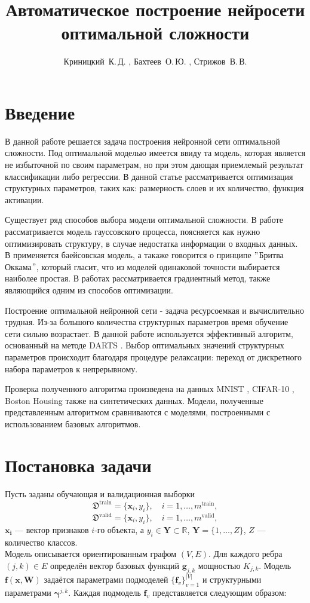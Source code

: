 \documentclass[12pt, twoside]{article}
\title
    {Автоматическое построение нейросети оптимальной сложности }
\author
    {Криницкий~К.\,Д. , Бахтеев~О.\,Ю. , Стрижов~В.\,В.}
\begin{document}
\maketitle

\section{Введение}
  В данной работе решается задача построения нейронной сети оптимальной сложности. Под оптимальной моделью имеется ввиду та модель, которая является не избыточной по своим параметрам, но при этом дающая приемлемый результат классификации либо регрессии. В данной статье рассматривается оптимизация структурных параметров, таких как: размерность слоев и их количество, функция активации.
  \par Существует ряд способов выбора модели оптимальной сложности. В работе \cite{GaussianModel} рассматривается модель гауссовского процесса, поясняется как нужно оптимизировать структуру, в случае недостатка информации о входных данных. В \cite{BayesianModel} применяется баейсовская модель, а такаже говорится о принципе $"$Бритва Оккама$"$, который гласит, что из моделей одинаковой точности выбирается наиболее простая. В работах \cite{Gradient1,Gradient2,Gradient3,Gradient4} рассматривается градиентный метод, также являющийся одним из способов оптимизации. 
  \par Построение оптимальной нейронной сети - задача ресурсоемкая и вычислительно трудная. Из-за большого количества структурных параметров время обучение сети сильно возрастает. В данной работе используется эффективный алгоритм, основанный на методе DARTS \cite{DARTS}. Выбор оптимальных значений структурных параметров происходит благодаря процедуре релаксации: переход от дискретного набора параметров к непрерывному.
  \par Проверка полученного алгоритма произведена на данных MNIST \cite{MNIST}, CIFAR-10 \cite{CIFAR}, Boston Housing \cite{Boston} также на синтетических данных. Модели, полученные представленным алгоритмом сравниваются с моделями, построенными с использованием базовых алгоритмов.



\section{Постановка задачи}
Пусть заданы обучающая и валидационная выборки
$$
\mathfrak{D}^{\text{train}} = \{\mathbf{x}_i, y_i\}, \quad i=1,\dots,m^{\text{train}},
$$
$$
\mathfrak{D}^{\text{valid}} = \{\mathbf{x}_i, y_i\}, \quad i=1,\dots,m^{\text{valid}},
$$
$\mathbf{x_i}$ --- вектор признаков $i$-го объекта, а $y_i\in\mathbf{Y}\subset\mathbb{R}$, $\mathbf{Y} = \{1,\dots,Z\}$, $Z$ --- количество классов.\\
Модель описывается ориентированным графом $(V, E)$. Для каждого ребра $(j, k) \in E$ определён вектор базовых функций $\textbf{g}_{j, k}$ мощностью $K_{j, k}$. Модель $\textbf{f}(\textbf{x}, \textbf{W})$ задаётся параметрами подмоделей $\{\textbf{f}_{v}\}_{v = 1}^{|V|}$ и структурными параметрами $\boldsymbol{\gamma}^{j,k}$.  
	Каждая подмодель $\textbf{f}_{v}$ представляется следующим образом:
	
\end{document}
